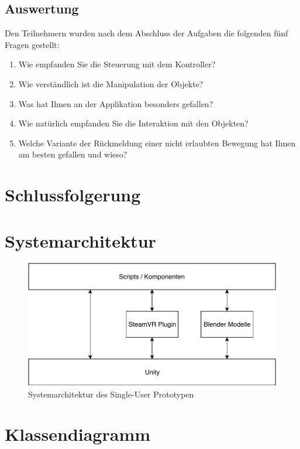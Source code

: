 \subsection{Auswertung}
Den Teilnehmern wurden nach dem Abschluss der Aufgaben die folgenden fünf Fragen gestellt:

\begin{enumerate} [itemsep=1pt,topsep=0pt]
	\item Wie empfanden Sie die Steuerung mit dem Kontroller?
	
	\item Wie verständlich ist die Manipulation der Objekte?
	
	\item Was hat Ihnen an der Applikation besonders gefallen?
	
	\item Wie natürlich empfanden Sie die Interaktion mit den Objekten?
	
	\item Welche Variante der Rückmeldung einer nicht erlaubten Bewegung hat Ihnen am besten gefallen und wieso?
\end{enumerate}


\section{Schlussfolgerung}

\section{Systemarchitektur}
\begin{figure}[h!]
	\centering
	\includegraphics[keepaspectratio,width=0.75\linewidth]{img/ArchitekturT1.pdf}
	\caption{Systemarchitektur des Single-User Prototypen}
	\label{fig:Systemarchitektur_Single_User}
\end{figure}

\section{Klassendiagramm}